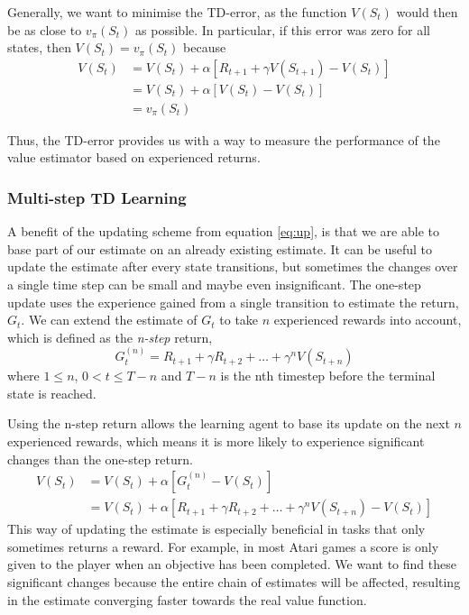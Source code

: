 \documentclass[11pt]{article}
\begin{document}
Generally, we want to minimise the TD-error, as the function $V(S_t)$
would then be as close to $v_\pi(S_t)$ as possible.
In particular, if this error was zero for all states, then
$V(S_t) = v_\pi(S_t)$ because 
\begin{equation}
    \begin{aligned}
    V(S_t)  & = V(S_t) + \alpha  [R_{t+1} + \gamma  V(S_{t+1}) - V(S_t)]   \\
           & = V(S_t) + \alpha  [V(S_t) - V(S_t)]  \\
           & = v_\pi(S_t) 
    \end{aligned}
\end{equation}

Thus, the TD-error provides us with a way to measure the performance of
the value estimator based on experienced returns.

\subsubsection{Multi-step TD Learning}\label{sec:multi}

A benefit of the updating scheme from equation \ref{eq:up}, is that we are able to base
part of our estimate on an already existing estimate.
It can be useful to update the estimate after every state transitions, but sometimes
the changes over a single time step can be small and maybe even insignificant.
The one-step update uses the experience gained from a single transition to
estimate the return, $G_t$.
We can extend the estimate of $G_t$ to take $n$ experienced rewards
into account, which is defined as the \textit{n-step} return,
\begin{equation}
    G^{(n)}_t = R_{t+1} + \gamma R_{t+2} + \dots + \gamma^n V(S_{t+n})
\end{equation}
where $1 \leq n$, $0 < t \leq T - n$ and $T - n$ is the nth timestep before the terminal state
is reached.

Using the n-step return allows the learning agent to base its update on the next $n$ experienced
rewards, which means it is more likely to experience significant changes than the one-step return.
\begin{equation}
    \begin{aligned}    
        V(S_t) & = V(S_t) + \alpha [G^{(n)}_t - V(S_t)]\\
        & = V(S_t) + \alpha [R_{t+1} + \gamma R_{t+2} + \dots + \gamma^n V(S_{t+n}) - V(S_t)]
    \end{aligned}
\end{equation}
This way of updating the estimate is especially beneficial in tasks that only sometimes returns a reward. 
For example, in most Atari games a score is only given to the player when an objective has been completed.
We want to find these significant changes because the entire chain of estimates 
will be affected, resulting in the estimate converging faster towards the real value function.
\end{document}
